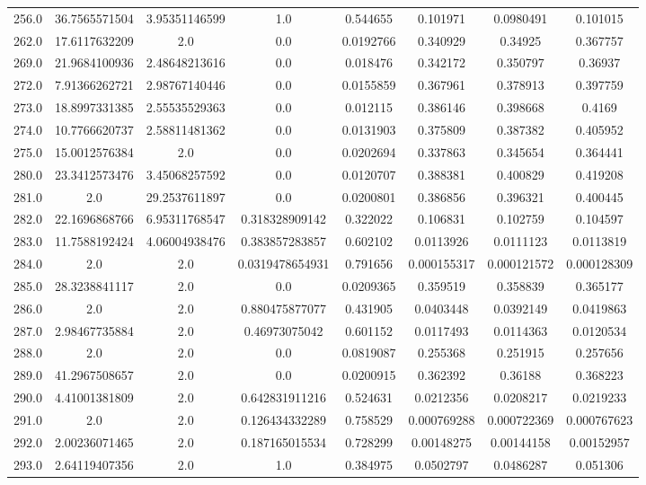\begin{longtable}{|c|c|c|c|c|c|c|c|}
256.0 & 36.7565571504 & 3.95351146599 & 1.0 & 0.544655 & 0.101971 & 0.0980491 & 0.101015 \\
262.0 & 17.6117632209 & 2.0 & 0.0 & 0.0192766 & 0.340929 & 0.34925 & 0.367757 \\
269.0 & 21.9684100936 & 2.48648213616 & 0.0 & 0.018476 & 0.342172 & 0.350797 & 0.36937 \\
272.0 & 7.91366262721 & 2.98767140446 & 0.0 & 0.0155859 & 0.367961 & 0.378913 & 0.397759 \\
273.0 & 18.8997331385 & 2.55535529363 & 0.0 & 0.012115 & 0.386146 & 0.398668 & 0.4169 \\
274.0 & 10.7766620737 & 2.58811481362 & 0.0 & 0.0131903 & 0.375809 & 0.387382 & 0.405952 \\
275.0 & 15.0012576384 & 2.0 & 0.0 & 0.0202694 & 0.337863 & 0.345654 & 0.364441 \\
280.0 & 23.3412573476 & 3.45068257592 & 0.0 & 0.0120707 & 0.388381 & 0.400829 & 0.419208 \\
281.0 & 2.0 & 29.2537611897 & 0.0 & 0.0200801 & 0.386856 & 0.396321 & 0.400445 \\
282.0 & 22.1696868766 & 6.95311768547 & 0.318328909142 & 0.322022 & 0.106831 & 0.102759 & 0.104597 \\
283.0 & 11.7588192424 & 4.06004938476 & 0.383857283857 & 0.602102 & 0.0113926 & 0.0111123 & 0.0113819 \\
284.0 & 2.0 & 2.0 & 0.0319478654931 & 0.791656 & 0.000155317 & 0.000121572 & 0.000128309 \\
285.0 & 28.3238841117 & 2.0 & 0.0 & 0.0209365 & 0.359519 & 0.358839 & 0.365177 \\
286.0 & 2.0 & 2.0 & 0.880475877077 & 0.431905 & 0.0403448 & 0.0392149 & 0.0419863 \\
287.0 & 2.98467735884 & 2.0 & 0.46973075042 & 0.601152 & 0.0117493 & 0.0114363 & 0.0120534 \\
288.0 & 2.0 & 2.0 & 0.0 & 0.0819087 & 0.255368 & 0.251915 & 0.257656 \\
289.0 & 41.2967508657 & 2.0 & 0.0 & 0.0200915 & 0.362392 & 0.36188 & 0.368223 \\
290.0 & 4.41001381809 & 2.0 & 0.642831911216 & 0.524631 & 0.0212356 & 0.0208217 & 0.0219233 \\
291.0 & 2.0 & 2.0 & 0.126434332289 & 0.758529 & 0.000769288 & 0.000722369 & 0.000767623 \\
292.0 & 2.00236071465 & 2.0 & 0.187165015534 & 0.728299 & 0.00148275 & 0.00144158 & 0.00152957 \\
293.0 & 2.64119407356 & 2.0 & 1.0 & 0.384975 & 0.0502797 & 0.0486287 & 0.051306 \\

\end{longtable}
